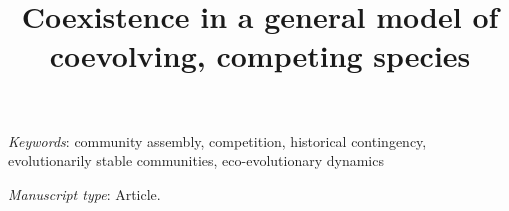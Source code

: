 \documentclass[11pt]{article}
\title{Coexistence in a general model of coevolving, competing species}
\author{}
\date{}
\begin{document}
\maketitle

\raggedright
\setlength{\parskip}{1em}



%

\bigskip


\bigskip


\textit{Keywords}: {
community assembly,
competition,
historical contingency,
evolutionarily stable communities,
eco-evolutionary dynamics}


\bigskip

\textit{Manuscript type}: Article.

\bigskip


\linenumbers{}
\modulolinenumbers[3]



\clearpage













\end{document}
